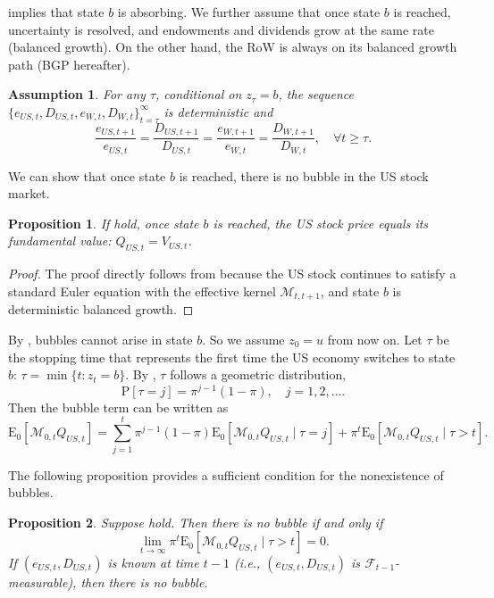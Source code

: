 \documentclass[12pt]{article}
\theoremstyle{plain}
\newtheorem{ass}{Assumption}
\newtheorem{prop}{Proposition}
\begin{document}
 implies that state $b$ is absorbing. We further assume that once state $b$ is reached, uncertainty is resolved,
and endowments and dividends grow at the same rate (balanced growth). On the other hand, the RoW is always on its balanced growth path (BGP hereafter).

\begin{ass}\label{ass_balanced_growth}
For any $\tau$, conditional on $z_\tau = b$, the sequence
$\{e_{US,t}, D_{US,t}, e_{W,t}, D_{W,t}\}_{t=\tau}^\infty$ is deterministic and
\[
\frac{e_{US,t+1}}{e_{US, t}} =
\frac{D_{US, t+1}}{D_{US,t}}=
\frac{e_{W,t+1}}{e_{W, t}} =
\frac{D_{W, t+1}}{D_{W,t}} ,\quad \forall t \geq \tau.
\]
\end{ass}

We can show that once state $b$ is reached, there is no bubble in the US stock market.

\begin{prop}\label{prop1}
If  hold, once state $b$ is reached, the US stock price equals its fundamental value:
$Q_{US,t}=V_{US,t}$.
\end{prop}

\begin{proof}
The proof directly follows from \citet{hirano2025technological} because the US stock continues to satisfy a standard
Euler equation with the effective kernel $\mathcal M_{t,t+1}$, and state $b$ is deterministic balanced growth.
\end{proof}

By , bubbles cannot arise in state $b$. So we assume $z_0=u$ from now on. Let $\tau$ be the stopping time that represents the first time the US economy switches to state $b$:
$\tau =\min \{t:z_t=b\}$. By , $\tau$ follows a geometric distribution,
\[
\mathrm{P}[\tau=j]=\pi^{j-1}(1-\pi), \quad j=1,2,\dots.
\]
Then the bubble term can be written as
\[
\mathrm{E}_0\left[\mathcal{M}_{0 , t} Q_{US,t}\right]
=\sum_{j=1}^t \pi^{j-1}(1-\pi) \mathrm{E}_0\left[\mathcal{M}_{0,t} Q_{US,t} \mid \tau=j\right]
+\pi^t \mathrm{E}_0\left[\mathcal{M}_{0, t} Q_{US,t} \mid \tau>t\right].
\]

The following proposition provides a sufficient condition for the nonexistence of bubbles.

\begin{prop}\label{prop2}
Suppose  hold. Then there is no bubble if and only if
\[
\lim _{t \rightarrow \infty} \pi^t \mathrm{E}_0\left[\mathcal{M}_{0,t} Q_{US,t} \mid \tau>t\right]=0.
\]
If $(e_{US,t}, D_{US,t})$ is known at time $t-1$ (i.e., $(e_{US,t},D_{US,t})$ is $\mathcal{F}_{t-1}$-measurable), then there is no bubble.
\end{prop}
\end{document}
